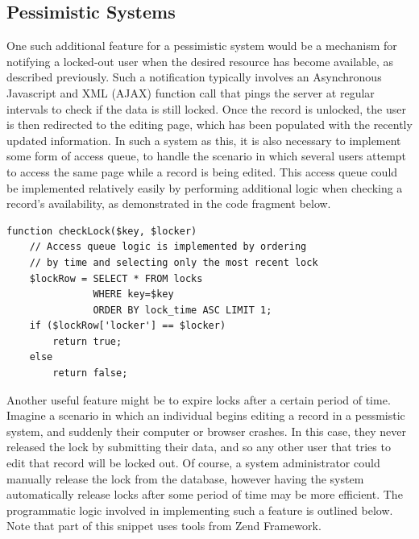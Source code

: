 \documentclass[12pt]{article}
\begin{document}
\subsection{Pessimistic Systems}
One such additional feature for a pessimistic system would be a mechanism for notifying a locked-out user when the desired resource has become available, as described previously. Such a notification typically involves an Asynchronous Javascript and XML (AJAX) function call that pings the server at regular intervals to check if the data is still locked. Once the record is unlocked, the user is then redirected to the editing page, which has been populated with the recently updated information. In such a system as this, it is also necessary to implement some form of access queue, to handle the scenario in which several users attempt to access the same page while a record is being edited. This access queue could be implemented relatively easily by performing additional logic when checking a record's availability, as demonstrated in the code fragment below.

\begin{framed}
\begin{spacing}{1.0}
\begin{verbatim}
function checkLock($key, $locker)
    // Access queue logic is implemented by ordering 
    // by time and selecting only the most recent lock
    $lockRow = SELECT * FROM locks
               WHERE key=$key
               ORDER BY lock_time ASC LIMIT 1;
    if ($lockRow['locker'] == $locker)
        return true;
    else
        return false;

\end{verbatim}
\end{spacing}
\end{framed}

Another useful feature might be to expire locks after a certain period of time. Imagine a scenario in which an individual begins editing a record in a pessmistic system, and suddenly their computer or browser crashes. In this case, they never released the lock by submitting their data, and so any other user that tries to edit that record will be locked out. Of course, a system administrator could manually release the lock from the database, however having the system automatically release locks after some period of time may be more efficient. The programmatic logic involved in implementing such a feature is outlined below. Note that part of this snippet uses tools from Zend Framework.

\newpage
\end{document}
